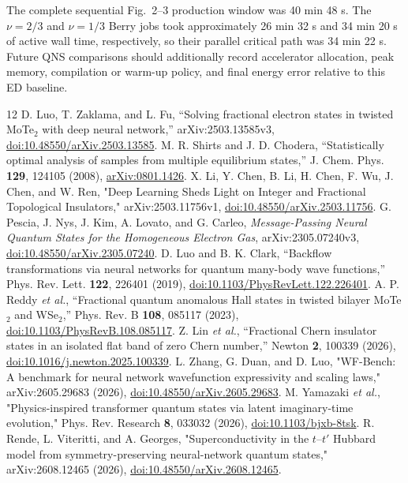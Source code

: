 \documentclass[10pt,twocolumn]{article}
\begin{document}
The complete sequential Fig.~2--3 production window was 40 min 48 s.  The
$\nu=2/3$ and $\nu=1/3$ Berry jobs took approximately 26 min 32 s and
34 min 20 s of active wall time, respectively, so their parallel critical path
was 34 min 22 s.  Future QNS comparisons should additionally record accelerator
allocation, peak memory, compilation or warm-up policy, and final energy error
relative to this ED baseline.


\begin{thebibliography}{12}
 D. Luo, T. Zaklama, and L. Fu, ``Solving fractional electron states in twisted MoTe$_2$ with deep neural network,'' arXiv:2503.13585v3, \href{https://doi.org/10.48550/arXiv.2503.13585}{doi:10.48550/arXiv.2503.13585}.
 M. R. Shirts and J. D. Chodera, ``Statistically optimal analysis of samples from multiple equilibrium states,'' J. Chem. Phys. \textbf{129}, 124105 (2008), \href{https://arxiv.org/abs/0801.1426}{arXiv:0801.1426}.
 X. Li, Y. Chen, B. Li, H. Chen, F. Wu, J. Chen, and W. Ren,
"Deep Learning Sheds Light on Integer and Fractional Topological Insulators,"
arXiv:2503.11756v1,
\href{https://doi.org/10.48550/arXiv.2503.11756}{doi:10.48550/arXiv.2503.11756}.
 G. Pescia, J. Nys, J. Kim, A. Lovato, and G. Carleo, \emph{Message-Passing Neural Quantum States for the Homogeneous Electron Gas}, arXiv:2305.07240v3, \href{https://doi.org/10.48550/arXiv.2305.07240}{doi:10.48550/arXiv.2305.07240}.
 D. Luo and B. K. Clark, ``Backflow transformations via neural networks for quantum many-body wave functions,'' Phys. Rev. Lett. \textbf{122}, 226401 (2019), \href{https://doi.org/10.1103/PhysRevLett.122.226401}{doi:10.1103/PhysRevLett.122.226401}.
 A. P. Reddy \emph{et al.}, ``Fractional quantum anomalous Hall states in twisted bilayer MoTe$_2$ and WSe$_2$,'' Phys. Rev. B \textbf{108}, 085117 (2023), \href{https://doi.org/10.1103/PhysRevB.108.085117}{doi:10.1103/PhysRevB.108.085117}.
 Z. Lin \emph{et al.}, ``Fractional Chern insulator states in an isolated flat band of zero Chern number,'' Newton \textbf{2}, 100339 (2026), \href{https://doi.org/10.1016/j.newton.2025.100339}{doi:10.1016/j.newton.2025.100339}.
 L. Zhang, G. Duan, and D. Luo, "WF-Bench: A benchmark for neural network wavefunction expressivity and scaling laws," arXiv:2605.29683 (2026), \href{https://doi.org/10.48550/arXiv.2605.29683}{doi:10.48550/arXiv.2605.29683}.
 M. Yamazaki \emph{et al.}, "Physics-inspired transformer quantum states via latent imaginary-time evolution," Phys. Rev. Research \textbf{8}, 033032 (2026), \href{https://doi.org/10.1103/bjxb-8tsk}{doi:10.1103/bjxb-8tsk}.
 R. Rende, L. Viteritti, and A. Georges, "Superconductivity in the $t$--$t'$ Hubbard model from symmetry-preserving neural-network quantum states," arXiv:2608.12465 (2026), \href{https://doi.org/10.48550/arXiv.2608.12465}{doi:10.48550/arXiv.2608.12465}.
\end{thebibliography}


\end{document}
